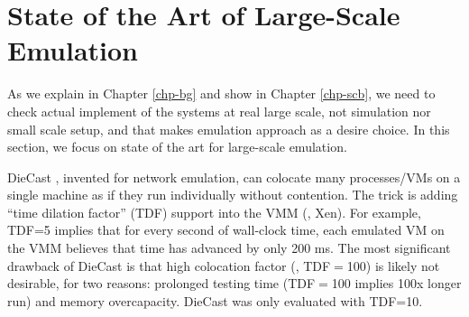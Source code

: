 %



\section{State of the Art of Large-Scale Emulation}
\label{mot-state}

As we explain in Chapter \ref{chp-bg} and show in Chapter \ref{chp-scb}, we need
to check actual implement of the systems at real large scale, not simulation nor
small scale setup, and that makes emulation approach as a desire choice. In this
section, we focus on state of the art for large-scale emulation.

%
DieCast \cite{Gupta+08-DieCast}, invented for network emulation, can colocate
many processes/VMs on a single machine as if they run individually without
contention.  The trick is adding ``time dilation factor'' (TDF) support
\cite{Gupta+06-TimeDilation} into the VMM (\eg, Xen).
%
For example, TDF=5 implies that for every second of wall-clock time, each
emulated VM on the VMM believes that time has advanced by only 200 ms.
%
The most significant drawback of DieCast is that high colocation factor (\eg,
TDF$=$100) is likely not desirable, for two reasons: prolonged testing time
(TDF$=$100 implies 100x longer run) and memory overcapacity.  DieCast was only
evaluated with TDF=10.


